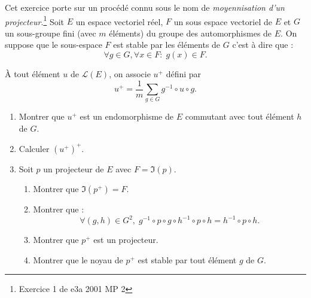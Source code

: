 Cet exercice porte sur un procédé connu sous le nom de \emph{moyennisation d'un projecteur}.\footnote{Exercice 1 de e3a 2001 MP 2}
Soit $E$ un espace vectoriel r{\'e}el, $F$ un sous espace vectoriel de $E$ et $G$ un sous-groupe fini (avec $m$ éléments) du groupe des automorphismes de $E$.\newline
On suppose que le sous-espace $F$ est stable par les {\'e}l{\'e}ments de $G$ c'est {\`a} dire que :
\[
\forall g \in G , \forall x \in F :\; g(x)\in F.
\]

{\`A} tout {\'e}l{\'e}ment $u$ de $\mathcal{L}(E)$, on associe $u^+$ d{\'e}fini par
\[
u^+ = \frac{1}{m}\sum_{g\in G} g^{-1}\circ u \circ g.
\]
\begin{enumerate}
  \item Montrer que $u^+$ est un endomorphisme de $E$ commutant avec tout {\'e}l{\'e}ment $h$ de $G$.
  \item Calculer $(u^+)^+$.
  \item Soit $p$ un projecteur de $E$ avec $F = \Im (p)$.
  \begin{enumerate}
    \item Montrer que $\Im(p^+) = F$.
    \item Montrer que :
  \[
\forall (g,h)\in G^2,\;  g^{-1} \circ p \circ g \circ h^{-1} \circ p \circ h = h^{-1} \circ p \circ h.
  \]
    \item Montrer que $p^+$ est un projecteur.
    \item Montrer que le noyau de $p^+$ est stable par tout {\'e}l{\'e}ment $g$ de $G$.
  \end{enumerate}
\end{enumerate}